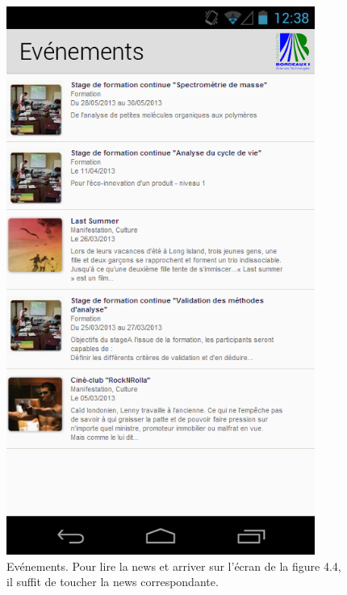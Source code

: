 \documentclass [pdftex,12pt] {report}
\begin{document}
\begin{figure}
  \begin{minipage}[t]{8cm}
    \centering
    \includegraphics[width=0.9\textwidth]{resources/ui_preview/03}
    \caption{Evénements. Pour lire la news et arriver sur l'écran de la figure 4.4, il suffit de toucher la news correspondante.}
    \label{fig:03}
  \end{minipage}
  \begin{minipage}[t]{8cm}
    \centering

\end{minipage}
\end{figure}
\end{document}
